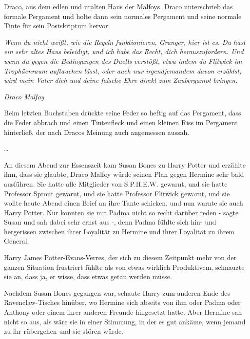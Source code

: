 {Draco, aus dem edlen und uralten Haus der Malfoys. Draco unterschrieb das formale Pergament und holte dann sein normales Pergament und seine normale Tinte für sein Postskriptum hervor:

\emph{Wenn du nicht weißt, wie die Regeln funktionieren, Granger, hier ist es. Du hast ein sehr altes Haus beleidigt, und ich habe das Recht, dich herauszufordern. Und wenn du gegen die Bedingungen des Duells verstößt, etwa indem du Flitwick im Trophäenraum auftauchen lässt, oder auch nur irgendjemandem davon erzählst, wird mein Vater dich und deine falsche Ehre direkt zum Zaubergamot bringen.}

\emph{Draco Malfoy}

Beim letzten Buchstaben drückte seine Feder so heftig auf das Pergament, dass die Feder abbrach und einen Tintenfleck und einen kleinen Riss im Pergament hinterließ, der nach Dracos Meinung auch angemessen aussah.

…

An diesem Abend zur Essenszeit kam Susan Bones zu Harry Potter und erzählte ihm, dass sie glaubte, Draco Malfoy würde seinen Plan gegen Hermine sehr bald ausführen. Sie hatte alle Mitglieder von S.P.H.E.W. gewarnt, und sie hatte Professor Sprout gewarnt, und sie hatte Professor Flitwick gewarnt, und sie wollte heute Abend einen Brief an ihre Tante schicken, und nun warnte sie auch Harry Potter. Nur konnten sie mit Padma nicht so recht darüber reden - sagte Susan und sah dabei sehr ernst aus -, denn Padma fühlte sich hin- und hergerissen zwischen ihrer Loyalität zu Hermine und ihrer Loyalität zu ihrem General.

Harry James Potter-Evans-Verres, der sich zu diesem Zeitpunkt mehr von der ganzen Situation frustriert fühlte als von etwas wirklich Produktivem, schnauzte sie an, dass ja, er wisse, dass etwas getan werden müsse.

Nachdem Susan Bones gegangen war, schaute Harry zum anderen Ende des Ravenclaw-Tisches hinüber, wo Hermine sich abseits von ihm oder Padma oder Anthony oder einem ihrer anderen Freunde hingesetzt hatte. Aber Hermine sah nicht so aus, als wäre sie in einer Stimmung, in der es gut ankäme, wenn jemand zu ihr rübergehen und sie stören würde.

}
